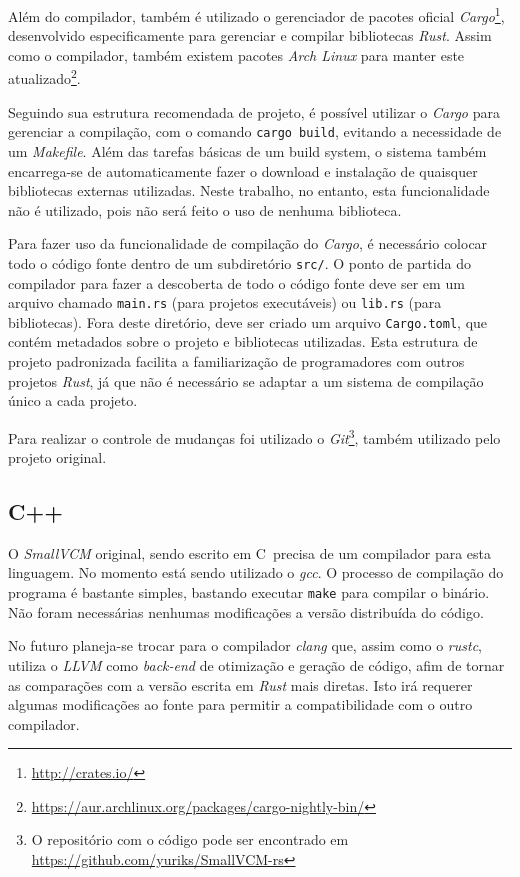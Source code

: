 \documentclass[tg]{mdtufsm}
\def\Cpp{{C\nolinebreak[4]\raisebox{.20ex}{\small\bf++}}}
\begin{document}
Além do compilador, também é utilizado o gerenciador de pacotes oficial \emph{Cargo}\footnote{\url{http://crates.io/}}, desenvolvido especificamente para gerenciar e compilar bibliotecas \emph{Rust}. Assim como o compilador, também existem pacotes \emph{Arch Linux} para manter este atualizado\footnote{\url{https://aur.archlinux.org/packages/cargo-nightly-bin/}}.

Seguindo sua estrutura recomendada de projeto, é possível utilizar o \emph{Cargo} para gerenciar a compilação, com o comando \texttt{cargo build}, evitando a necessidade de um \emph{Makefile}. Além das tarefas básicas de um build system, o sistema também encarrega-se de automaticamente fazer o download e instalação de quaisquer bibliotecas externas utilizadas. Neste trabalho, no entanto, esta funcionalidade não é utilizado, pois não será feito o uso de nenhuma biblioteca.

Para fazer uso da funcionalidade de compilação do \emph{Cargo}, é necessário colocar todo o código fonte dentro de um subdiretório \texttt{src/}. O ponto de partida do compilador para fazer a descoberta de todo o código fonte deve ser em um arquivo chamado \texttt{main.rs} (para projetos executáveis) ou \texttt{lib.rs} (para bibliotecas). Fora deste diretório, deve ser criado um arquivo \texttt{Cargo.toml}, que contém metadados sobre o projeto e bibliotecas utilizadas. Esta estrutura de projeto padronizada facilita a familiarização de programadores com outros projetos \emph{Rust}, já que não é necessário se adaptar a um sistema de compilação único a cada projeto.

Para realizar o controle de mudanças foi utilizado o \emph{Git}\footnote{O repositório com o código pode ser encontrado em \url{https://github.com/yuriks/SmallVCM-rs}}, também utilizado pelo projeto original.

\subsection{C++}

O \emph{SmallVCM} original, sendo escrito em \Cpp\ precisa de um compilador para esta linguagem. No momento está sendo utilizado o \emph{gcc}. O processo de compilação do programa é bastante simples, bastando executar \texttt{make} para compilar o binário. Não foram necessárias nenhumas modificações a versão distribuída do código.

No futuro planeja-se trocar para o compilador \emph{clang} que, assim como o \emph{rustc}, utiliza o \emph{LLVM} como \emph{back-end} de otimização e geração de código, afim de tornar as comparações com a versão escrita em \emph{Rust} mais diretas. Isto irá requerer algumas modificações ao fonte para permitir a compatibilidade com o outro compilador.
\end{document}
